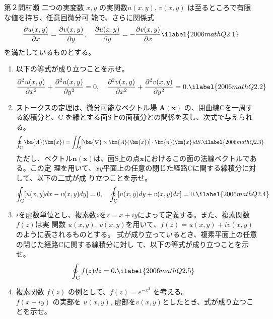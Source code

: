 \begin{question}{第２問}{村瀬}
二つの実変数 $x,y$ の実関数$u(x,y),\, v(x,y)$ は至るところで有限な値を持ち、任意回微分可
能で、さらに関係式
\begin{align}
  \frac{\partial u(x,y)}{\partial x} = \frac{\partial v(x,y)}{\partial y}, \quad
  \frac{\partial u(x,y)}{\partial y} = -\frac{\partial v(x,y)}{\partial x} \ilabel{2006mathQ2.1}
\end{align}
を満たしているものとする。
\begin{enumerate}
\item
  以下の等式が成り立つことを示せ。
  \begin{align}
    \frac{\partial^2 u(x,y)}{\partial x^2} + \frac{\partial^2 u(x,y)}{\partial y^2} =0, \quad
    \frac{\partial^2 v(x,y)}{\partial x^2} + \frac{\partial^2 v(x,y)}{\partial y^2} =0. \ilabel{2006mathQ2.2}
  \end{align}

\item
  ストークスの定理は、微分可能なベクトル場 $\bm{A}(\bm{x})$ の、閉曲線$\mathrm{C}$を一周する線積分と、$\mathrm{C}$
  を縁とする面$\mathrm{S}$上の面積分との関係を表し、次式で与えられる。
  \begin{align}
    \oint_{\mathrm{C}} \bm{A}(\bm{x})
    &= \iint_{\mathrm{S}} [\bm{\nabla}\times\bm{A}(\bm{x})]\cdot\bm{n}(\bm{x})dS. \ilabel{2006mathQ2.3}
  \end{align}
  ただし、ベクトル$\bm{n}(\bm{x})$は、面$\mathrm{S}$上の点$\bm{x}$におけるこの面の法線ベクトルである。この定
  理を用いて、$xy$平面上の任意の閉じた経路$\mathrm{C}$に関する線積分に対して、以下の二式が成
  り立つことを示せ。
  \begin{align}
    \oint_{\mathrm{C}}[u(x,y)dx - v(x,y)dy] = 0, \quad
    \oint_{\mathrm{C}}[u(x,y)dy + v(x,y)dx] = 0. \ilabel{2006mathQ2.4}
  \end{align}

\item
  $i$を虚数単位とし、複素数$z$を$z=x+iy$によって定義する。また、複素関数$f(z)$は実
  関数 $u(x,y),\, v(x,y)$を用いて、$f(z)=u(x,y)+iv(x,y)$のように表されるものとする。
  式が成り立っているとき、複素平面上の任意の閉じた経路$\mathrm{C}$に関する線積分に対し
  て、以下の等式が成り立つことを示せ。
  \begin{align}
    \oint_{\mathrm{C}}f(z)dz &= 0. \ilabel{2006mathQ2.5}
  \end{align}

\item
  複素関数 $f(z)$ の例として、$f(z)=e^{-x^2}$ を考える。\\
  $f(x+iy)$ の実部を $u(x,y)$, 虚部を$v(x,y)$としたとき、式が成り立つことを示せ。


\end{enumerate}
\end{question}
